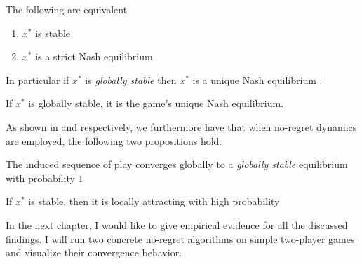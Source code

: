\begin{proposition}\label{prop:StrictStableEquivalent}
    The following are equivalent
    \begin{enumerate}
        \item $x^*$ is stable
        \item $x^*$ is a strict Nash equilibrium
    \end{enumerate}
\end{proposition}
    
In particular if $x^*$ is \textit{globally stable} then $x^*$ is a unique Nash equilibrium \cite[Prop.2.5]{mertikopoulos}.

\begin{proposition}\label{prop:GloballyStableUniqueNE}
    If $x^*$ is globally stable, it is the game’s unique Nash equilibrium.
\end{proposition}

As shown in \cite[Theorem 4.7]{mertikopoulos} and \cite[Theorem 4.11]{mertikopoulos} respectively, we furthermore have that when no-regret dynamics are employed, the following two propositions hold.

\begin{proposition}\label{prop:globalConvergence}
    The induced sequence of play converges globally to a \textit{globally stable} equilibrium with probability $1$
\end{proposition}

\begin{proposition}\label{prop:localConvergence}
    If $x^*$ is stable, then it is locally attracting with high probability
\end{proposition}


In the next chapter, I would like to give empirical evidence for all the discussed findings. I will run two concrete no-regret algorithms on simple two-player games and visualize their convergence behavior.
